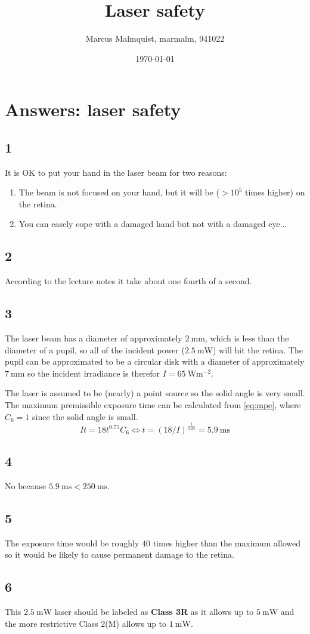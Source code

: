 \documentclass[12pt,a4paper]{article}
\title{Laser safety}
\author{Marcus Malmquist, marmalm, 941022}
\date{\today}
\begin{document}
\maketitle

\section{Answers: laser safety}\label{sec:1}

\subsection{1}
It is OK to put your hand in the laser beam for two reasons:
\begin{enumerate}
\item The beam is not focused on your hand, but it will be ($>10^5$ times higher) on the retina.
\item You can easely cope with a damaged hand but not with a damaged eye...
\end{enumerate}
\subsection{2}
According to the lecture notes it take about one fourth of a second.
\subsection{3}
The laser beam has a diameter of approximately $\SI{2}{\milli\metre}$, which is less than the diameter of a pupil, so all of the incident power ($\SI{2.5}{\milli\watt}$) will hit the retina. The pupil can be approximated to be a circular disk with a diameter of approximately $\SI{7}{\milli\metre}$ so the incident irradiance is therefor $I=\SI{65}{\watt\metre^{-2}}$.

The laser is assumed to be (nearly) a point source so the solid angle is very small. The maximum premissible exposure time can be calculated from \ref{eq:mpe}, where $C_6=1$ since the solid angle is small.
\begin{equation}
  \label{eq:mpe}
  It=18t^{0.75}C_6 \Leftrightarrow t=(18/I)^{\frac{1}{0.25}}=\SI{5.9}{\milli\second}
\end{equation}
\subsection{4}
No because $\SI{5.9}{\milli\second}<\SI{250}{\milli\second}$.
\subsection{5}
The exposure time would be roughly 40 times higher than the maximum allowed so it would be likely to cause permanent damage to the retina.
\subsection{6}
This $\SI{2.5}{\milli\watt}$ laser should be labeled as \textbf{Class 3R} as it allows up to $\SI{5}{\milli\watt}$ and the more restrictive Class 2(M) allows up to $\SI{1}{\milli\watt}$.
\end{document}
